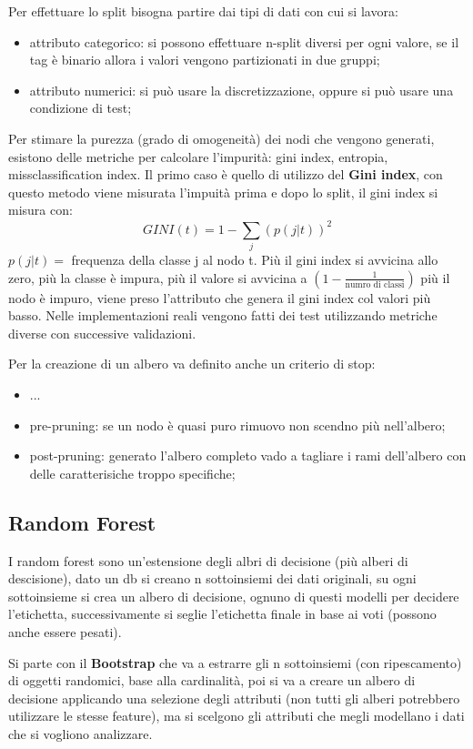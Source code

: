 \documentclass[12pt]{article}
\begin{document}
Per effettuare lo split bisogna partire dai tipi di dati con cui si lavora:
\begin{itemize}
    \item attributo categorico: si possono effettuare n-split diversi per ogni valore, se il tag \`e binario allora i valori vengono partizionati in due gruppi;
    \item attributo numerici: si pu\`o usare la discretizzazione, oppure si pu\`o usare una condizione di test;
\end{itemize}

Per stimare la purezza (grado di omogeneit\`a) dei nodi che vengono generati, esistono delle metriche per calcolare l'impurit\`a: gini index, entropia, missclassification index. Il primo caso \`e quello di utilizzo del \textbf{Gini index}, con questo metodo viene misurata l'impuit\`a prima e dopo lo split, il gini index si misura con:
\[ GINI(t) = 1 - \sum_{j}^{} (p(j|t))^{2} \]
$p(j|t) = $ frequenza della classe j al nodo t. Pi\`u il gini index si avvicina allo zero, pi\`u la classe \`e impura, pi\`u il valore si avvicina a $(1 - \frac{1}{\text{numro di classi}} )$ pi\`u il nodo \`e impuro, viene preso l'attributo che genera il gini index col valori pi\`u basso. Nelle implementazioni reali vengono fatti dei test utilizzando metriche diverse con successive validazioni.

Per la creazione di un albero va definito anche un criterio di stop:
\begin{itemize}
    \item ...
    \item pre-pruning: se un nodo \`e quasi puro rimuovo non scendno pi\`u nell'albero;
    \item post-pruning: generato l'albero completo vado a tagliare i rami dell'albero con delle caratterisiche troppo specifiche;
\end{itemize}



\subsection{Random Forest}
I random forest sono un'estensione degli albri di decisione (pi\`u alberi di descisione), dato un db si creano n sottoinsiemi dei dati originali, su ogni sottoinsieme si crea un albero di decisione, ognuno di questi modelli per decidere l'etichetta, successivamente si seglie l'etichetta finale in base ai voti (possono anche essere pesati).

Si parte con il \textbf{Bootstrap} che va a estrarre gli n sottoinsiemi (con ripescamento) di oggetti randomici, base alla cardinalit\`a, poi si va a creare un albero di decisione applicando una selezione degli attributi (non tutti gli alberi potrebbero utilizzare le stesse feature), ma si scelgono gli attributi che megli modellano i dati che si vogliono analizzare.
\end{document}
